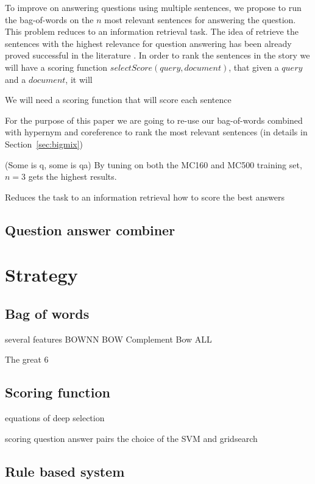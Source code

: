\documentclass[11pt]{article}
\begin{document}
To improve on answering questions using multiple sentences, we propose to run the bag-of-words on the $n$ most relevant sentences for answering the question.
This problem reduces to an information retrieval task.
The idea of retrieve the sentences with the highest relevance for question answering has been already proved successful in the literature \cite{qa_techniques, deep_selection}.
In order to rank the sentences in the story we will have a scoring function $selectScore(query, document)$, that given a $query$ and a $document$, it will %

We will need a scoring function that will score each sentence

 For the purpose of this paper we are going to re-use our bag-of-words combined with hypernym and coreference to rank the most relevant sentences (in details in Section~\ref{sec:bigmix})



(Some is q, some is qa)  By tuning on both the {\small MC160} and {\small MC500} training set, $n=3$ gets the highest results.

Reduces the task to an information retrieval
how to score the best answers

\subsection{Question answer combiner}

\section{Strategy}
\subsection{Bag of words}
\label{sec:bagofwords}
several features
BOWNN
BOW Complement
Bow ALL

The great 6

\subsection{Scoring function}
equations of deep selection

scoring question answer pairs
the choice of the SVM and gridsearch
\label{sec:bigmix}

\subsection{Rule based system}
\label{sec:rulebased}
\end{document}
